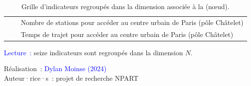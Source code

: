 \begin{table}[h!]
{\begin{tabular}{p{}p{}p{}}
& \small{\multirow{1.5}{*}{\(N_{15}\)}} & \small{Nombre de stations pour accéder au centre urbain de Paris (pôle Châtelet)}\\
& \small{\multirow{1.5}{*}{\(N_{16}\)}} & \small{Temps de trajet pour accéder au centre urbain de Paris (pôle Châtelet)}\\
        \hline
        \end{tabular}}
    \caption{Grille d'indicateurs regroupés dans la dimension associée à la  (nœud).}
    \label{table-chap6:indicateurs-node}
        \vspace{5pt}
        \begin{flushleft}\scriptsize{
        \textcolor{blue}{Lecture~:} seize indicateurs sont regroupés dans la dimension \(N\). 
        }\end{flushleft}
        \begin{flushright}\scriptsize{
        Réalisation~: \textcolor{blue}{Dylan Moinse (2024)}
        \\
        Auteur·rice·s~: projet de recherche \acrshort{NPART}
        }\end{flushright}
        \end{table}